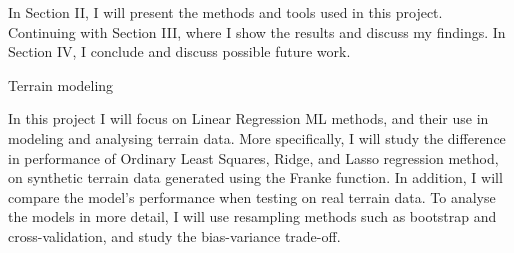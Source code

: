In Section II, I will present the methods and tools used in this project. Continuing with Section III, where I show the results and discuss my findings. In Section IV, I conclude and discuss possible future work.


 
Terrain modeling \cite{opengeohub:2020:eu_terrain}

In this project I will focus on Linear Regression ML methods, and their use in modeling and analysing terrain data. More specifically, I will study the difference in performance of Ordinary Least Squares, Ridge, and Lasso regression method, on synthetic terrain data generated using the Franke function. In addition, I will compare the model's performance when testing on real terrain data. To analyse the models in more detail, I will use resampling methods such as bootstrap and cross-validation, and study the bias-variance trade-off.

